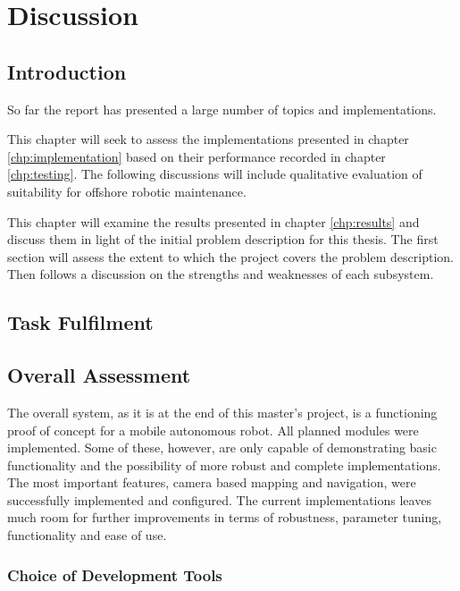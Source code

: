 \chapter{Discussion}
\label{chp:discussion} 

\section{Introduction}

So far the report has presented a large number of topics and implementations.

This chapter will seek to assess the implementations presented in chapter \ref{chp:implementation} based on their performance recorded in chapter \ref{chp:testing}. The following discussions will include qualitative evaluation of suitability for offshore robotic maintenance.

This chapter will examine the results presented in chapter \ref{chp:results} and discuss them in light of the initial problem description for this thesis. The first section will assess the extent to which the project covers the problem description. Then follows a discussion on the strengths and weaknesses of each subsystem.


\section{Task Fulfilment}



\section{Overall Assessment}

The overall system, as it is at the end of this master's project, is a functioning proof of concept for a mobile autonomous robot. All planned modules were implemented. Some of these, however, are only capable of demonstrating basic functionality and the possibility of more robust and complete implementations. The most important features, camera based mapping and navigation, were successfully implemented and configured. The current implementations leaves much room for further improvements in terms of robustness, parameter tuning, functionality and ease of use.

\subsection{Choice of Development Tools}

